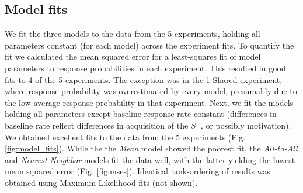 \subsection*{Model fits}
We fit the three models to the data from the 5 experiments, holding all parameters constant (for each model) across the experiment fits.  
To quantify the fit we calculated the mean squared error for a least-squares fit of model parameters to response probabilities in each experiment.  
This resulted in good fits to 4 of the 5 experiments. 
The exception was in the 1-Shared experiment, where response probability was overestimated by every model, presumably due to the low average response probability in that experiment.  
Next, we fit the models holding all parameters except baseline response rate constant (differences in baseline rate reflect differences in acquisition of the $S^+$, or possibly motivation). 
We obtained excellent fits to the data from the 5 experiments (Fig. \ref{fig:model_fits}).  
While the the \textit{Mean} model showed the poorest fit, the \textit{All-to-All} and \textit{Nearest-Neighbor} models fit the data well, with the latter yielding the lowest mean squared error (Fig. \ref{fig:mses}).  Identical rank-ordering of results was obtained using Maximum Likelihood fits (not shown).  